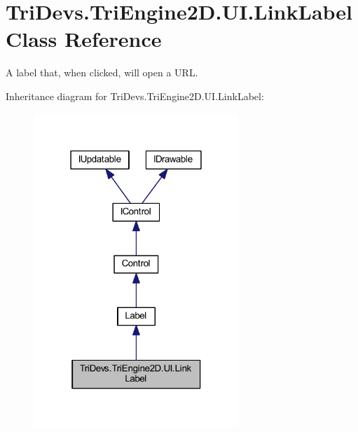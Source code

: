 \hypertarget{class_tri_devs_1_1_tri_engine2_d_1_1_u_i_1_1_link_label}{\section{Tri\-Devs.\-Tri\-Engine2\-D.\-U\-I.\-Link\-Label Class Reference}
\label{class_tri_devs_1_1_tri_engine2_d_1_1_u_i_1_1_link_label}
}


A label that, when clicked, will open a U\-R\-L.  




Inheritance diagram for Tri\-Devs.\-Tri\-Engine2\-D.\-U\-I.\-Link\-Label\-:
\nopagebreak
\begin{figure}[H]
\begin{center}
\leavevmode
\includegraphics[width=219pt]{class_tri_devs_1_1_tri_engine2_d_1_1_u_i_1_1_link_label__inherit__graph}
\end{center}
\end{figure}


